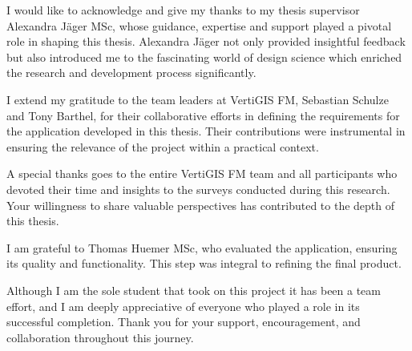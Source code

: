 \documentclass[
11pt, %
english, %
singlespacing, %
headsepline, %
]{MastersDoctoralThesis} %
\begin{document}
\begin{acknowledgements}
\addchaptertocentry{\acknowledgementname} %
I would like to acknowledge and give my thanks to my thesis supervisor Alexandra Jäger MSc, whose guidance, expertise and support played a pivotal role in shaping this thesis.
Alexandra Jäger not only provided insightful feedback but also introduced me to the fascinating world of design science which enriched the research and development process significantly.

I extend my gratitude to the team leaders at VertiGIS FM, Sebastian Schulze and Tony Barthel, for their collaborative efforts in defining the requirements for the application developed in this thesis.
Their contributions were instrumental in ensuring the relevance of the project within a practical context.

A special thanks goes to the entire VertiGIS FM team and all participants who devoted their time and insights to the surveys conducted during this research.
Your willingness to share valuable perspectives has contributed to the depth of this thesis.

I am grateful to Thomas Huemer MSc, who evaluated the application, ensuring its quality and functionality.
This step was integral to refining the final product.

Although I am the sole student that took on this project it has been a team effort, and I am deeply appreciative of everyone who played a role in its successful completion.
Thank you for your support, encouragement, and collaboration throughout this journey. 
\end{acknowledgements}


\tableofcontents %

\listoffigures %

\listoftables %

\end{document}
